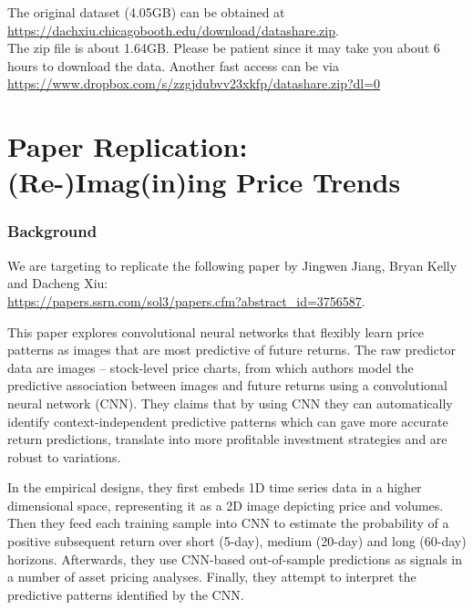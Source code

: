 \documentclass[11pt]{article}
\begin{document}
The original dataset (4.05GB) can be obtained at \\ 
\url{https://dachxiu.chicagobooth.edu/download/datashare.zip}. \\
The zip file is about 1.64GB. Please be patient since it may take you about 6 hours to download the data. Another fast access can be via \\
\url{https://www.dropbox.com/s/zzgjdubvv23xkfp/datashare.zip?dl=0}




\section{Paper Replication: (Re-)Imag(in)ing Price Trends}


\subsubsection{Background}
We are targeting to replicate the following paper by Jingwen Jiang, Bryan Kelly and Dacheng Xiu: \\
\url{https://papers.ssrn.com/sol3/papers.cfm?abstract_id=3756587}.

This paper explores convolutional neural networks that flexibly learn price patterns as images that are most predictive of future returns. The raw predictor data are images -- stock-level price charts, from which authors model the predictive association between images and future returns using a convolutional neural network (CNN). They claims that by using CNN they can automatically identify context-independent predictive patterns which can gave more accurate return predictions, translate into more profitable investment strategies and are robust to variations. 

In the empirical designs, they first embeds 1D time series data in a higher dimensional space, representing it as a 2D image depicting price and volumes. Then they feed each training sample into CNN to estimate the probability of a positive subsequent return over short (5-day), medium (20-day) and long (60-day) horizons. Afterwards, they use CNN-based out-of-sample predictions as signals in a number of asset pricing analyses. Finally, they attempt to interpret the predictive patterns identified by the CNN.
\end{document}
